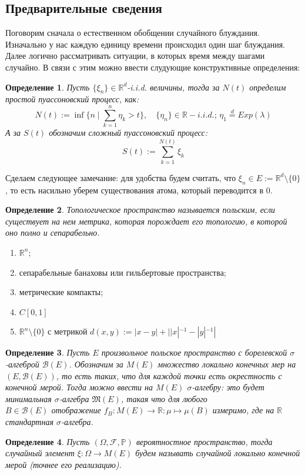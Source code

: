 \documentclass[12pt,a4paper]{article} %
\newtheorem{definition}{Определение}
\newcommand{\R}{\mathbb{R}}
\newcommand{\PR}{\mathbb{P}}
\newcommand{\F}{\mathcal{F}}
\newcommand{\M}{\mathfrak{M}}
\begin{document}
	\subsection{Предварительные сведения}
	Поговорим сначала о естественном обобщении случайного блуждания. Изначально у нас каждую единицу времени происходил один шаг блуждания. Далее логично рассматривать ситуации, в которых время между шагами случайно. В связи с этим можно ввести слудующие конструктивные определения:
	\begin{definition}
		Пусть $\{\xi_n\}\in\R^d$-i.i.d. величины, тогда за $N(t)$ определим простой пуассоновский процесс, как:
		$$N(t):=\inf\{n\mid\sum_{k=1}^n\eta_k>t\},\quad\{\eta_n\}\in\R-i.i.d.;\,\eta_1\overset{d}{=}Exp(\lambda)$$
		А за $S(t)$ обозначим сложный пуассоновский процесс:
		$$S(t):=\sum_{k=1}^{N(t)}\xi_k$$
	\end{definition}
	Сделаем следующее замечание: для удобства будем считать, что $\xi_n\in E:=\R^d\setminus\{0\}$, то есть насильно уберем существования атома, который переводится в 0.
	\begin{definition}
		Топологическое пространство называется польским, если существует на нем метрика, которая порождает его топологию, в которой оно полно и сепарабельно.
	\end{definition}
	\begin{enumerate}
		\item $\R^n$;
		\item сепарабельные банаховы или гильбертовые пространства;
		\item метрические компакты;
		\item $C[0,1]$
		\item $\R^n\setminus\{0\}$  с метрикой $d(x,y):=|x-y|+||x|^{-1}-|y|^{-1}|$
	\end{enumerate}
	\begin{definition}
		Пусть $E$ произвольное польское пространство с борелевской $\sigma$-алгеброй $\mathcal{B}(E)$. Обозначим за $M(E)$ множество локально конечных мер на $(E,\mathcal{B}(E))$, то есть таких, что для каждой точки есть окрестность с конечной мерой. Тогда можно ввести на $M(E)$ $\sigma$-алгебру: это будет минимальная $\sigma$-алгебра $\M(E)$, такая что для любого \\$B\in\mathcal{B}(E)$ отображение $f_B:M(E)\rightarrow\R:\mu\mapsto\mu(B)$ измеримо, где на $\R$ стандартная $\sigma$-алгебра.
	\end{definition}
	\begin{definition}
		Пусть $(\Omega,\F,\PR)$ вероятностное пространство, тогда случайный элемент $\xi:\Omega\rightarrow M(E)$ будем называть случайной локально конечной мерой (точнее его реализацию).
	\end{definition}
\end{document}
